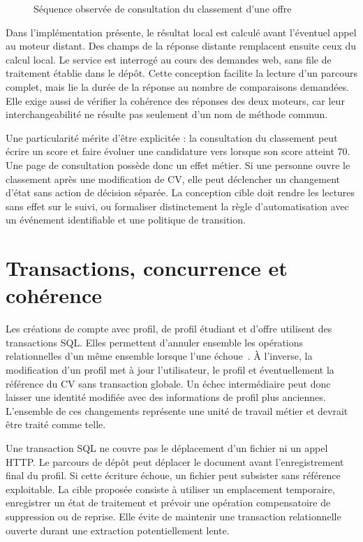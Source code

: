 \begin{figure}[htbp]
\centering

\caption{Séquence observée de consultation du classement d'une offre}
\label{fig:sequence-conception}
\end{figure}

Dans l'implémentation présente, le résultat local est calculé avant l'éventuel appel au moteur distant. Des champs de la réponse distante remplacent ensuite ceux du calcul local. Le service est interrogé au cours des demandes web, sans file de traitement établie dans le dépôt. Cette conception facilite la lecture d'un parcours complet, mais lie la durée de la réponse au nombre de comparaisons demandées. Elle exige aussi de vérifier la cohérence des réponses des deux moteurs, car leur interchangeabilité ne résulte pas seulement d'un nom de méthode commun.

Une particularité mérite d'être explicitée : la consultation du classement peut écrire un score et faire évoluer une candidature vers  lorsque son score atteint 70. Une page de consultation possède donc un effet métier. Si une personne ouvre le classement après une modification de CV, elle peut déclencher un changement d'état sans action de décision séparée. La conception cible doit rendre les lectures sans effet sur le suivi, ou formaliser distinctement la règle d'automatisation avec un événement identifiable et une politique de transition.

\section{Transactions, concurrence et cohérence}

Les créations de compte avec profil, de profil étudiant et d'offre utilisent des transactions SQL. Elles permettent d'annuler ensemble les opérations relationnelles d'un même ensemble lorsque l'une échoue~\cite{laravel-database}. À l'inverse, la modification d'un profil met à jour l'utilisateur, le profil et éventuellement la référence du CV sans transaction globale. Un échec intermédiaire peut donc laisser une identité modifiée avec des informations de profil plus anciennes. L'ensemble de ces changements représente une unité de travail métier et devrait être traité comme telle.

Une transaction SQL ne couvre pas le déplacement d'un fichier ni un appel HTTP. Le parcours de dépôt peut déplacer le document avant l'enregistrement final du profil. Si cette écriture échoue, un fichier peut subsister sans référence exploitable. La cible proposée consiste à utiliser un emplacement temporaire, enregistrer un état de traitement et prévoir une opération compensatoire de suppression ou de reprise. Elle évite de maintenir une transaction relationnelle ouverte durant une extraction potentiellement lente.

